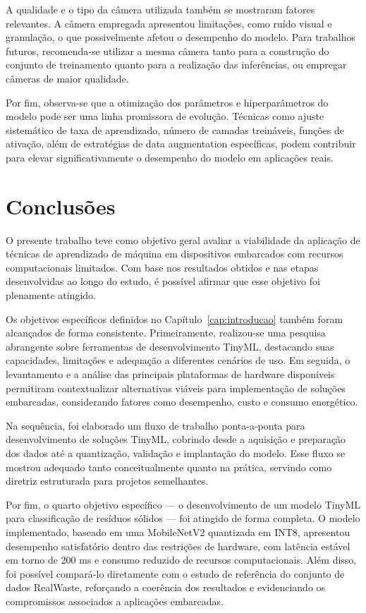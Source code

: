 \documentclass[repeatfields,xlists,xpacks,oneside]{ufrgscca}
\begin{document}
A qualidade e o tipo da câmera utilizada também se mostraram fatores relevantes. A câmera empregada apresentou limitações, como ruído visual e granulação, o que possivelmente afetou o desempenho do modelo. Para trabalhos futuros, recomenda-se utilizar a mesma câmera tanto para a construção do conjunto de treinamento quanto para a realização das inferências, ou empregar câmeras de maior qualidade.

Por fim, observa-se que a otimização dos parâmetros e hiperparâmetros do modelo pode ser uma linha promissora de evolução. Técnicas como ajuste sistemático de taxa de aprendizado, número de camadas treináveis, funções de ativação, além de estratégias de data augmentation específicas, podem contribuir para elevar significativamente o desempenho do modelo em aplicações reais.

\chapter{Conclusões}
\label{cap:conclusao}

O presente trabalho teve como objetivo geral avaliar a viabilidade da aplicação de técnicas de aprendizado de máquina em dispositivos embarcados com recursos computacionais limitados. Com base nos resultados obtidos e nas etapas desenvolvidas ao longo do estudo, é possível afirmar que esse objetivo foi plenamente atingido.

Os objetivos específicos definidos no Capítulo~\ref{cap:introducao} também foram alcançados de forma consistente. Primeiramente, realizou-se uma pesquisa abrangente sobre ferramentas de desenvolvimento TinyML, destacando suas capacidades, limitações e adequação a diferentes cenários de uso. Em seguida, o levantamento e a análise das principais plataformas de hardware disponíveis permitiram contextualizar alternativas viáveis para implementação de soluções embarcadas, considerando fatores como desempenho, custo e consumo energético.

Na sequência, foi elaborado um fluxo de trabalho ponta-a-ponta para desenvolvimento de soluções TinyML, cobrindo desde a aquisição e preparação dos dados até a quantização, validação e implantação do modelo. Esse fluxo se mostrou adequado tanto conceitualmente quanto na prática, servindo como diretriz estruturada para projetos semelhantes.

Por fim, o quarto objetivo específico — o desenvolvimento de um modelo TinyML para classificação de resíduos sólidos — foi atingido de forma completa. O modelo implementado, baseado em uma MobileNetV2 quantizada em INT8, apresentou desempenho satisfatório dentro das restrições de hardware, com latência estável em torno de 200 ms e consumo reduzido de recursos computacionais. Além disso, foi possível compará-lo diretamente com o estudo de referência do conjunto de dados RealWaste, reforçando a coerência dos resultados e evidenciando os compromissos associados a aplicações embarcadas.
\end{document}
